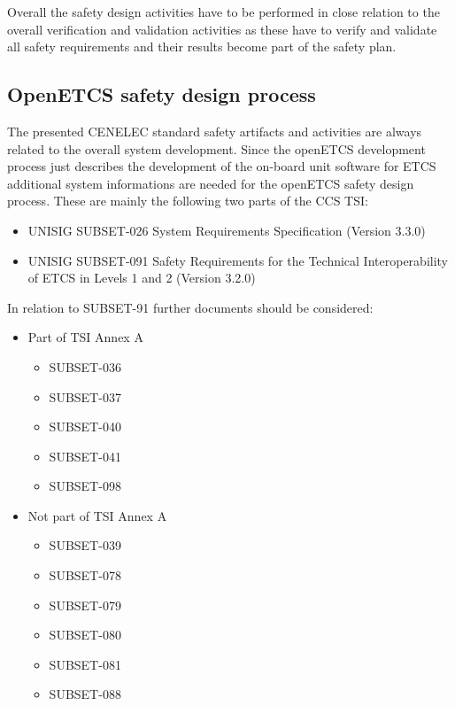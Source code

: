 \documentclass{template/openetcs_article}
\begin{document}
Overall the safety design activities have to be performed in close relation to the overall verification and validation activities as these have to verify and validate all safety requirements and their results become part of the safety plan.


\subsection{OpenETCS safety design process}

The presented CENELEC standard safety artifacts and activities are always related to the overall system development. Since the openETCS development process just describes the development of the on-board unit software for ETCS additional system informations are needed for the openETCS safety design process. These are mainly the following two parts of the CCS TSI:

\begin{itemize}
\item UNISIG SUBSET-026	System Requirements Specification 	(Version 3.3.0)
\item UNISIG SUBSET-091 Safety Requirements for the Technical Interoperability of ETCS in Levels 1 and 2 	(Version 3.2.0)
\end{itemize}

In relation to SUBSET-91 further documents should be considered:

\begin{itemize}
\item Part of TSI Annex A
	\begin{itemize}
	\item SUBSET-036
	\item SUBSET-037
	\item SUBSET-040
	\item SUBSET-041
	\item SUBSET-098
	\end{itemize}
	
\item Not part of TSI Annex A
	\begin{itemize}
	\item SUBSET-039
	\item SUBSET-078
	\item SUBSET-079
	\item SUBSET-080
	\item SUBSET-081
	\item SUBSET-088
	\end{itemize}
\end{itemize}
\end{document}

